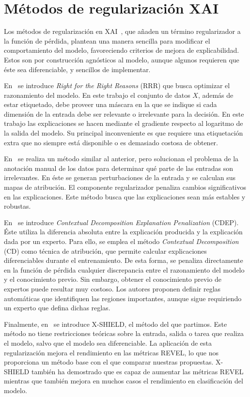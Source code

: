 \section{Métodos de regularización XAI}

Los métodos de regularización en XAI~\cite{XSHIELD, EstadoArteMetodos}, que añaden un término regularizador a la función de pérdida, plantean una manera sencilla para modificar el comportamiento del modelo, favoreciendo criterios de mejora de explicabilidad. Estos son por construcción agnósticos al modelo, aunque algunos requieren que éste sea diferenciable, y sencillos de implementar.

En~\cite{RRR} se introduce \textit{Right for the Right Reasons} (RRR) que busca optimizar el razonamiento del modelo. En este trabajo el conjunto de datos $X$, además de estar etiquetado, debe proveer una máscara en la que se indique si cada dimensión de la entrada debe ser relevante o irrelevante para la decisión. En este trabajo las explicaciones se hacen mediante el gradiente respecto al logaritmo de la salida del modelo. Su principal inconveniente es que requiere una etiquetación extra que no siempre está disponible o es demasiado costosa de obtener.

En~\cite{REGINPUTGRAD} se realiza un método similar al anterior, pero solucionan el problema de la anotación manual de los datos para determinar qué parte de las entradas son irrelevantes. En éste se generan perturbaciones de la entrada y se calculan sus mapas de atribución. El componente regularizador penaliza cambios significativos en las explicaciones. Este método busca que las explicaciones sean más estables y robustas. 

En~\cite{simpleregularizacion} se introduce \textit{Contextual Decomposition Explanation Penalization} (CDEP). Éste utiliza la diferencia absoluta entre la explicación producida y la explicación dada por un experto. Para ello, se emplea el método \textit{Contextual Decomposition} (CD) como técnica de atribución, que permite calcular explicaciones diferenciables durante el entrenamiento. De esta forma, se penaliza directamente en la función de pérdida cualquier discrepancia entre el razonamiento del modelo y el conocimiento previo. Sin embargo, obtener el conocimiento previo de expertos puede resultar muy costoso. Los autores proponen definir reglas automáticas que identifiquen las regiones importantes, aunque sigue requiriendo un experto que defina dichas reglas.

Finalmente, en~\cite{XSHIELD} se introduce X-SHIELD, el método del que partimos. Este método no tiene restricciones teóricas sobre la entrada, salida o tarea que realiza el modelo, salvo que el modelo sea diferenciable. La aplicación de esta regularización mejora el rendimiento en las métricas REVEL, lo que nos proporciona un método base con el que comparar nuestras propuestas. X-SHIELD también ha demostrado que es capaz de aumentar las métricas REVEL mientras que también mejora en muchos casos el rendimiento en clasificación del modelo.


